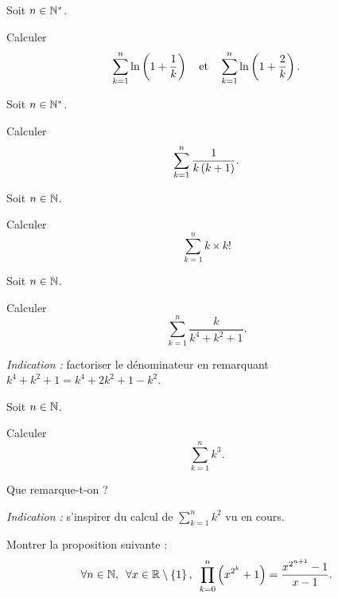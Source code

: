 \begin{corr}
\end{corr}

\begin{exo}
Soit \(n\in\mathbb{N}^*\).

Calculer \[\sum_{k=1}^n\ln\left(1+\dfrac{1}{k}\right)\quad\text{et}\quad\sum_{k=1}^{n}\ln\left(1+\dfrac{2}{k}\right).\]
\end{exo}

\begin{corr}
\end{corr}

\begin{exo}
Soit \(n\in\mathbb{N}^*\).

Calculer \[\sum_{k=1}^{n}\dfrac{1}{k\left(k+1\right)}.\]
\end{exo}

\begin{corr}
\end{corr}

\begin{exo}
Soit \(n\in\mathbb{N}\).

Calculer \[\sum_{k=1}^{n}k\times k!\]
\end{exo}

\begin{corr}
\end{corr}

\begin{exo}
Soit \(n\in\mathbb{N}\).

Calculer \[\sum_{k=1}^{n}\dfrac{k}{k^4+k^2+1}.\]

\textit{Indication :} factoriser le dénominateur en remarquant \(k^4+k^2+1=k^4+2k^2+1-k^2\).
\end{exo}

\begin{corr}
\end{corr}

\begin{exo}
Soit \(n\in\mathbb{N}\).

Calculer \[\sum_{k=1}^{n}k^3.\]

Que remarque-t-on ?

\textit{Indication :} s'inspirer du calcul de \(\sum_{k=1}^{n}k^2\) vu en cours.
\end{exo}

\begin{corr}
\end{corr}

\begin{exo}
Montrer la proposition suivante : \[\quantifs{\forall n\in\N;\forall x\in\R\excluant\accol{1}}\prod_{k=0}^{n}\paren{x^{2^k}+1}=\dfrac{x^{2^{n+1}}-1}{x-1}.\]
\end{exo}

